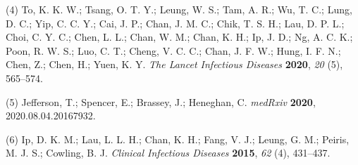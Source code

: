 \documentclass[journal=jacsat,manuscript=article]{achemso}
\begin{document}
\leavevmode\hypertarget{ref-To2020}{}%
(4) To, K. K. W.; Tsang, O. T. Y.; Leung, W. S.; Tam, A. R.; Wu, T. C.;
Lung, D. C.; Yip, C. C. Y.; Cai, J. P.; Chan, J. M. C.; Chik, T. S. H.;
Lau, D. P. L.; Choi, C. Y. C.; Chen, L. L.; Chan, W. M.; Chan, K. H.;
Ip, J. D.; Ng, A. C. K.; Poon, R. W. S.; Luo, C. T.; Cheng, V. C. C.;
Chan, J. F. W.; Hung, I. F. N.; Chen, Z.; Chen, H.; Yuen, K. Y.
\emph{The Lancet Infectious Diseases} \textbf{2020}, \emph{20} (5),
565--574.

\leavevmode\hypertarget{ref-Jefferson2020}{}%
(5) Jefferson, T.; Spencer, E.; Brassey, J.; Heneghan, C. \emph{medRxiv}
\textbf{2020}, 2020.08.04.20167932.

\leavevmode\hypertarget{ref-Ip2016}{}%
(6) Ip, D. K. M.; Lau, L. L. H.; Chan, K. H.; Fang, V. J.; Leung, G. M.;
Peiris, M. J. S.; Cowling, B. J. \emph{Clinical Infectious Diseases}
\textbf{2015}, \emph{62} (4), 431--437.
\end{document}
